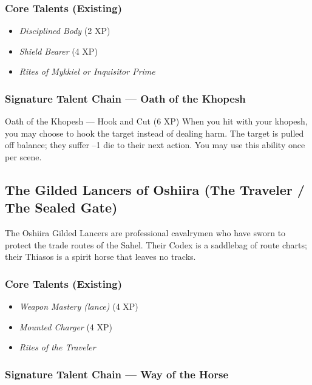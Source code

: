 \documentclass[9pt,a5paper]{extbook}
\begin{document}
\subsubsection{Core Talents (Existing)}
\begin{itemize}
    \item \textit{Disciplined Body} (2 XP)
    \item \textit{Shield Bearer} (4 XP)
    \item \textit{Rites of Mykkiel or Inquisitor Prime}
\end{itemize}

\subsubsection{Signature Talent Chain --- Oath of the Khopesh}

\begin{talentbox}{Oath of the Khopesh --- Hook and Cut (6 XP)}
When you hit with your khopesh, you may choose to hook the target instead of dealing harm. The target is pulled off balance; they suffer --1 die to their next action. You may use this ability once per scene.
\end{talentbox}

\subsection{The Gilded Lancers of Oshiira (The Traveler / The Sealed Gate)}

The Oshiira Gilded Lancers are professional cavalrymen who have sworn to protect the trade routes of the Sahel. Their Codex is a saddlebag of route charts; their Thiasos is a spirit horse that leaves no tracks.

\subsubsection{Core Talents (Existing)}
\begin{itemize}
    \item \textit{Weapon Mastery (lance)} (4 XP)
    \item \textit{Mounted Charger} (4 XP)
    \item \textit{Rites of the Traveler}
\end{itemize}

\subsubsection{Signature Talent Chain --- Way of the Horse}
\end{document}
